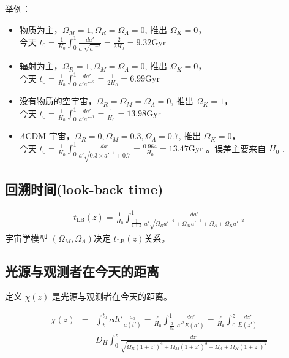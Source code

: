 \documentclass[12pt]{ctexart}
\begin{document}
举例：
\begin{itemize}
    \item 物质为主，$\Omega_M=1, \Omega_R=\Omega_\Lambda=0$, 推出 $\Omega_K=0$，\\今天 $t_0=\frac{1}{H_0}\int_0^1 \frac{da'}{a' \sqrt{a'^{-3}}}=\frac{2}{3 H_0}=9.32 \mathrm{Gyr}$ 
    \item 辐射为主，$\Omega_R=1, \Omega_M=\Omega_\Lambda=0$, 推出 $\Omega_K=0$，\\今天 $t_0=\frac{1}{H_0}\int_0^1 \frac{da'}{a' a'^{-2}}=\frac{1}{2 H_0}=6.99 \mathrm{Gyr}$ 
    \item 没有物质的空宇宙，$\Omega_R=\Omega_M=\Omega_\Lambda=0$, 推出 $\Omega_K=1$，\\今天 $t_0=\frac{1}{H_0}\int_0^1 \frac{da'}{a' a'^{-1}}=\frac{1}{ H_0}=13.98 \mathrm{Gyr}$ 
    \item $\Lambda$CDM 宇宙，$\Omega_R=0, \Omega_M=0.3,\Omega_\Lambda=0.7$, 推出 $\Omega_K=0$，\\今天 $t_0=\frac{1}{H_0}\int_0^1 \frac{da'}{a' \sqrt{0.3\times a'^{-3}+0.7} }=\frac{0.964}{ H_0}=13.47 \mathrm{Gyr}$ 。误差主要来自 $H_0$ .
\end{itemize}

\subsection{回溯时间(look-back time)}
\begin{eqnarray}
    t_\text{LB}(z)  = \frac{1}{H_0}\int_\frac{1}{1+z}^1 \frac{da'}{a' \sqrt{\Omega_R a'^{-4}+\Omega_M a'^{-3}+\Omega_\Lambda+\Omega_K a'^{-2}}}
\end{eqnarray}
宇宙学模型 $\left(\Omega_M, \Omega_\Lambda\right) $决定 $t_\text{LB}(z)$关系。

\subsection{光源与观测者在今天的距离}

定义 $\chi(z)$ 是光源与观测者在今天的距离。 

\begin{eqnarray}
    \chi(z) &=& \int_t^{t_0} cdt' \frac{a_0}{a(t')} = \frac{c}{H_0}\int_{\frac{a}{a_0}}^1 \frac{da'}{a'^2 E(a')} =\frac{c}{H_0}\int_0^z \frac{dz'}{E(z')} \\ 
    &=&  D_H \int_0^z \frac{dz'}{ \sqrt{\Omega_R(1+z')^{4}+\Omega_M(1+z')^{3}+\Omega_\Lambda+\Omega_K(1+z')^{2} }}
\end{eqnarray}
\end{document}
